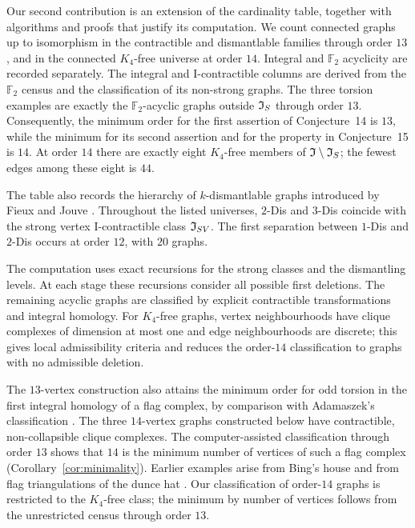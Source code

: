 Our second contribution is an extension of the cardinality table,
together with algorithms and proofs that justify its computation.
We count connected graphs up to isomorphism in the contractible and
dismantlable families through order $13$, and in the connected
$K_4$-free universe at order $14$. Integral and $\mathbb F_2$
acyclicity are recorded separately. The integral and I-contractible
columns are derived from the $\mathbb F_2$ census and the classification
of its non-strong graphs. The three torsion examples are
exactly the $\mathbb F_2$-acyclic graphs outside $\mathfrak I_S$ through order
$13$. Consequently, the minimum order for the first assertion of
Conjecture~14 is $13$, while the minimum for its second assertion and
for the property in Conjecture~15 is $14$. At order $14$ there are
exactly eight $K_4$-free members of $\mathfrak I\setminus\mathfrak I_S$; the fewest
edges among these eight is $44$.

The table also records the hierarchy of $k$-dismantlable graphs
introduced by Fieux and Jouve \cite{FieuxJouve2020}.
Throughout the listed universes, $2$-Dis and $3$-Dis coincide with
the strong vertex I-contractible class $\mathfrak I_{SV}$. The first separation
between $1$-Dis and $2$-Dis occurs at order $12$, with $20$ graphs.

The computation uses exact recursions for the strong classes and the
dismantling levels. At each stage these recursions consider all possible
first deletions. The remaining acyclic graphs are classified by explicit
contractible transformations and integral homology. For $K_4$-free
graphs, vertex neighbourhoods have clique complexes of dimension at most one and
edge neighbourhoods are discrete; this gives local admissibility criteria
and reduces the order-$14$ classification to graphs with no
admissible deletion.

The $13$-vertex construction also attains the minimum order for odd
torsion in the first integral homology of a flag complex, by comparison
with Adamaszek's classification \cite{Adamaszek2014}.
The three $14$-vertex graphs constructed below have contractible,
non-collapsible clique complexes. The computer-assisted classification through order
$13$ shows that $14$ is the minimum number of vertices of such a
flag complex (Corollary~\ref{cor:minimality}). Earlier examples arise
from Bing's house \cite{ChenYauYeh2001} and from flag triangulations
of the dunce hat \cite{FieuxJouve2020,DEFH2023}.
Our classification of order-$14$
graphs is restricted to the $K_4$-free class; the minimum by number
of vertices follows from the unrestricted census through order $13$.

